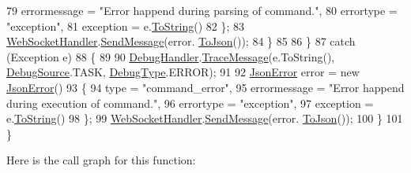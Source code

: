 \begin{DoxyCode}
79                         errormessage = \textcolor{stringliteral}{"Error happend during parsing of command."},
80                         errortype = \textcolor{stringliteral}{"exception"},
81                         exception = e.\mbox{\hyperlink{class_little_weeb_library_1_1_models_1_1_json_error_ad7d5522c90119111d2e929f39e7f6d3c}{ToString}}()
82                     \};
83                     \mbox{\hyperlink{class_little_weeb_library_1_1_handlers_1_1_web_socket_handler}{WebSocketHandler}}.\mbox{\hyperlink{class_little_weeb_library_1_1_handlers_1_1_web_socket_handler_a1de289d54d665a32c93478c68d3e6ad0}{SendMessage}}(error.
      \mbox{\hyperlink{class_little_weeb_library_1_1_models_1_1_json_error_a0e3e7dd2e2990404b7f0461742b23440}{ToJson}}());
84                 \}
85                
86             \}
87             \textcolor{keywordflow}{catch} (Exception e)
88             \{
89 
90                 \mbox{\hyperlink{class_little_weeb_library_1_1_handlers_1_1_debug_handler}{DebugHandler}}.\mbox{\hyperlink{class_little_weeb_library_1_1_handlers_1_1_debug_handler_afccb37dfd6b2114af72000c2f4fe4607}{TraceMessage}}(e.ToString(), 
      \mbox{\hyperlink{namespace_little_weeb_library_1_1_handlers_a2a6ca0775121c9c503d58aa254d292be}{DebugSource}}.TASK, \mbox{\hyperlink{namespace_little_weeb_library_1_1_handlers_ab66019ed40462876ec4e61bb3ccb0a62}{DebugType}}.ERROR);
91 
92                 \mbox{\hyperlink{class_little_weeb_library_1_1_models_1_1_json_error}{JsonError}} error = \textcolor{keyword}{new} \mbox{\hyperlink{class_little_weeb_library_1_1_models_1_1_json_error}{JsonError}}()
93                 \{
94                     type = \textcolor{stringliteral}{"command\_error"},
95                     errormessage = \textcolor{stringliteral}{"Error happend during execution of command."},
96                     errortype = \textcolor{stringliteral}{"exception"},
97                     exception = e.\mbox{\hyperlink{class_little_weeb_library_1_1_models_1_1_json_error_ad7d5522c90119111d2e929f39e7f6d3c}{ToString}}()
98                 \};
99                 \mbox{\hyperlink{class_little_weeb_library_1_1_handlers_1_1_web_socket_handler}{WebSocketHandler}}.\mbox{\hyperlink{class_little_weeb_library_1_1_handlers_1_1_web_socket_handler_a1de289d54d665a32c93478c68d3e6ad0}{SendMessage}}(error.
      \mbox{\hyperlink{class_little_weeb_library_1_1_models_1_1_json_error_a0e3e7dd2e2990404b7f0461742b23440}{ToJson}}());
100             \}
101         \}
\end{DoxyCode}
Here is the call graph for this function\+:\nopagebreak
